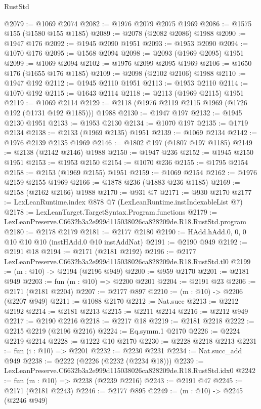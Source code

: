 \begin{lexlean}{RustStd}
\begin{coremodule}
@2079 := @1069 @2074
@2082 := @1976 @2079 @2075 @1969
@2086 := @1575 @155 (@1580 @155 @1185)
@2089 := @2078 (@2082 @2086) @1988
@2090 := @1947 @176
@2092 := @1945 @2090 @1951
@2093 := @1953 @2090
@2094 := @1070 @176
@2095 := @1568 @2094
@2098 := @2093 (@1969 @2095) @1951
@2099 := @1069 @2094
@2102 := @1976 @2099 @2095 @1969
@2106 := @1650 @176 (@1655 @176 @1185)
@2109 := @2098 (@2102 @2106) @1988
@2110 := @1947 @192
@2112 := @1945 @2110 @1951
@2113 := @1953 @2110
@2114 := @1070 @192
@2115 := @1643 @2114
@2118 := @2113 (@1969 @2115) @1951
@2119 := @1069 @2114
@2129 := @2118 (@1976 @2119 @2115 @1969 (@1726 @192 (@1731 @192 @1185))) @1988
@2130 := @1947 @197
@2132 := @1945 @2130 @1951
@2133 := @1953 @2130
@2134 := @1070 @197
@2135 := @1719 @2134
@2138 := @2133 (@1969 @2135) @1951
@2139 := @1069 @2134
@2142 := @1976 @2139 @2135 @1969
@2146 := @1802 @197 (@1807 @197 @1185)
@2149 := @2138 (@2142 @2146) @1988
@2150 := @1947 @236
@2152 := @1945 @2150 @1951
@2153 := @1953 @2150
@2154 := @1070 @236
@2155 := @1795 @2154
@2158 := @2153 (@1969 @2155) @1951
@2159 := @1069 @2154
@2162 := @1976 @2159 @2155 @1969
@2166 := @1878 @236 (@1883 @236 @1185)
@2169 := @2158 (@2162 @2166) @1988
@2170 := @931 @7
@2171 := @930 @2170
@2177 := LexLeanRuntime.index @878 @7 (LexLeanRuntime.instIndexableList @7)
@2178 := LexLeanTarget.TargetSyntax.Program.functions
@2179 := LexLeanPreserve.C6632b3a2e999d115038026ca828209de.R18.RustStd.program
@2180 := @2178 @2179
@2181 := @2177 @2180
@2190 := HAdd.hAdd.{0, 0, 0} @10 @10 @10 (instHAdd.{0} @10 instAddNat)
@2191 := @2190 @949
@2192 := @2191 @18
@2194 := @2171 (@2181 @2192)
@2196 := @2177 LexLeanPreserve.C6632b3a2e999d115038026ca828209de.R18.RustStd.tl0
@2199 := (m : @10) -> @2194 (@2196 @949)
@2200 := @959 @2170
@2201 := @2181 @949
@2203 := fun (m : @10) => @2200 @2201
@2204 := @2191 @23
@2206 := @2171 (@2181 @2204)
@2207 := @2177 @897
@2210 := (m : @10) -> @2206 (@2207 @949)
@2211 := @1088 @2170
@2212 := Nat.succ
@2213 := @2212 @2192
@2214 := @2181 @2213
@2215 := @2211 @2214
@2216 := @2212 @949
@2217 := @2190 @2216
@2218 := @2217 @18
@2219 := @2181 @2218
@2222 := @2215 @2219 (@2196 @2216)
@2224 := Eq.symm.{1} @2170
@2226 := @2224 @2219 @2214
@2228 := @1222 @10 @2170
@2230 := @2228 @2218 @2213
@2231 := fun (i : @10) => @2201
@2232 := @2230 @2231
@2234 := Nat.succ_add @949
@2238 := @2222 (@2226 (@2232 (@2234 @18)))
@2239 := LexLeanPreserve.C6632b3a2e999d115038026ca828209de.R18.RustStd.idx0
@2242 := fun (m : @10) => @2238 (@2239 @2216)
@2243 := @2191 @47
@2245 := @2171 (@2181 @2243)
@2246 := @2177 @895
@2249 := (m : @10) -> @2245 (@2246 @949)

\end{coremodule}
\end{lexlean}

